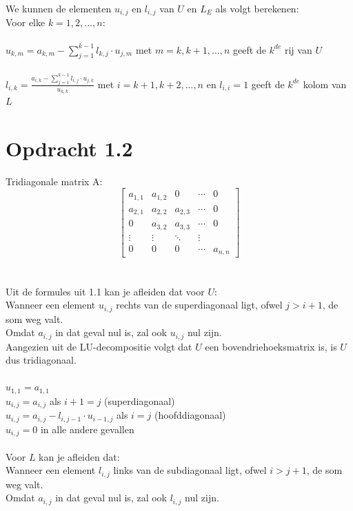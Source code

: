\documentclass[a4paper]{article}
\begin{document}
We kunnen de elementen $u_{i,j}$ en $ l_{i,j}$ van $U$ en $L_{E}$ als volgt berekenen:
\\Voor elke $k = 1,2,...,n:$
\\{}
\\ \textbullet { } $u_{k,m} = a_{k,m} - \sum_{j=1}^{k-1}l_{k,j} \cdot u_{j,m} $ met $m = k,k+1,...,n$ geeft de $k^{de}$ rij van $U$
\\{}
\\ \textbullet { } $l_{i,k} = \frac{a_{i,k}-  \sum_{j=1}^{k-1}l_{i,j} \cdot u_{j,k}}{u_{k,k}}$ met $i = k+1,k+2,...,n$ en $l_{i,i} = 1$ geeft de $k^{de}$ kolom van $L$
%
%
%
%
%
%
\section*{Opdracht 1.2}
Tridiagonale matrix A:
\[ \begin{bmatrix}
  a_{1,1} & a_{1,2}& 0 & \cdots &0 \\
  a_{2,1} & a_{2,2}&a_{2,3} & \cdots &0 \\
 0 & a_{3,2}&a_{3,3} & \cdots &0 \\
  \vdots  & \vdots  & \ddots & \vdots  \\
 0 & 0 &0 & \cdots & a_{n,n} 
 \end{bmatrix}\]
\\{}
\\ \textbullet{ } Uit de formules uit 1.1 kan je afleiden dat voor $U$:
\\Wanneer een element $u_{i,j}$ rechts van de superdiagonaal ligt, ofwel $j > i+1 $, de som weg valt.
\\Omdat $a_{i,j}$ in dat geval nul is, zal ook $u_{i,j}$ nul zijn.
\\Aangezien uit de LU-decompositie volgt dat $U$ een bovendriehoeksmatrix is, is $U$ dus tridiagonaal.
\\{}
\\$u_{1,1} = a_{1,1}$
\\$u_{i,j} = a_{i,j}$ als $i+1=j$ (superdiagonaal)
\\$u_{i,j} = a_{i,j} - l_{i,j-1} \cdot u_{i-1,j}$ als $i=j$ (hoofddiagonaal)
\\$u_{i,j} = 0$ in alle andere gevallen
\\{}
\\ \textbullet { }Voor $L$ kan je afleiden dat:
\\Wanneer een element $l_{i,j}$ links van de subdiagonaal ligt, ofwel $i > j+1$, de som weg valt.
\\Omdat $a_{i,j}$ in dat geval nul is, zal ook $l_{i,j}$ nul zijn.
\end{document}
